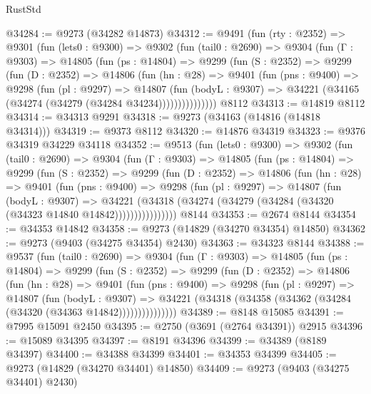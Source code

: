 \begin{lexlean}{RustStd}
\begin{coremodule}
{\begin{coremodule}
{{{{{{{{{{{{{{{{{{{{{{{{{{{{{{{{{{{{{{{{{{{{{{{{{{{{{{{@34284 := @9273 (@34282 @14873)
@34312 := @9491
    (fun (rty : @2352) =>
    @9301
      (fun (lets0 : @9300) =>
      @9302
        (fun (tail0 : @2690) =>
        @9304
          (fun (Γ : @9303) =>
          @14805
            (fun (ps : @14804) =>
            @9299
              (fun (S : @2352) =>
              @9299
                (fun (D : @2352) =>
                @14806
                  (fun (hn : @28) =>
                  @9401
                    (fun (pns : @9400) =>
                    @9298
                      (fun (pl : @9297) =>
                      @14807
                        (fun (bodyL : @9307) =>
                        @34221 (@34165 (@34274 (@34279 (@34284 @34234)))))))))))))))
    @8112
@34313 := @14819 @8112
@34314 := @34313 @9291
@34318 := @9273 (@34163 (@14816 (@14818 @34314)))
@34319 := @9373 @8112
@34320 := @14876 @34319
@34323 := @9376 @34319 @34229 @34118
@34352 := @9513
    (fun (lets0 : @9300) =>
    @9302
      (fun (tail0 : @2690) =>
      @9304
        (fun (Γ : @9303) =>
        @14805
          (fun (ps : @14804) =>
          @9299
            (fun (S : @2352) =>
            @9299
              (fun (D : @2352) =>
              @14806
                (fun (hn : @28) =>
                @9401
                  (fun (pns : @9400) =>
                  @9298
                    (fun (pl : @9297) =>
                    @14807
                      (fun (bodyL : @9307) =>
                      @34221
                        (@34318
                          (@34274 (@34279 (@34284 (@34320 (@34323 @14840 @14842))))))))))))))))
    @8144
@34353 := @2674 @8144
@34354 := @34353 @14842
@34358 := @9273 (@14829 (@34270 @34354) @14850)
@34362 := @9273 (@9403 (@34275 @34354) @2430)
@34363 := @34323 @8144
@34388 := @9537
    (fun (tail0 : @2690) =>
    @9304
      (fun (Γ : @9303) =>
      @14805
        (fun (ps : @14804) =>
        @9299
          (fun (S : @2352) =>
          @9299
            (fun (D : @2352) =>
            @14806
              (fun (hn : @28) =>
              @9401
                (fun (pns : @9400) =>
                @9298
                  (fun (pl : @9297) =>
                  @14807
                    (fun (bodyL : @9307) =>
                    @34221 (@34318 (@34358 (@34362 (@34284 (@34320 (@34363 @14842)))))))))))))))
@34389 := @8148 @15085
@34391 := @7995 @15091 @2450
@34395 := @2750 (@3691 (@2764 @34391)) @2915
@34396 := @15089 @34395
@34397 := @8191 @34396
@34399 := @34389 (@8189 @34397)
@34400 := @34388 @34399
@34401 := @34353 @34399
@34405 := @9273 (@14829 (@34270 @34401) @14850)
@34409 := @9273 (@9403 (@34275 @34401) @2430)
}}}}}}}}}}}}}}}}}}}}}}}}}}}}}}}}}}}}}}}}}}}}}}}}}}}}}}}
\end{coremodule}}
\end{coremodule}
\end{lexlean}
